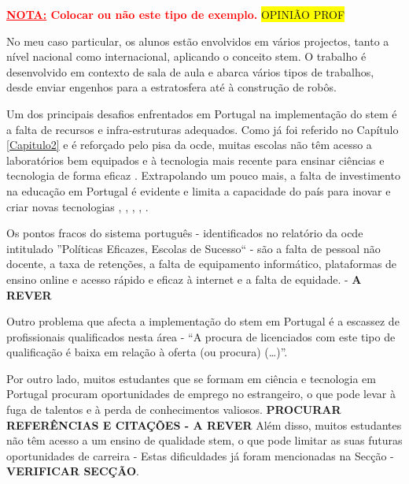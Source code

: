 \textcolor{red}{\textbf{\underline{NOTA:} Colocar ou não este tipo de exemplo.}}
\colorbox{yellow}{OPINIÃO PROF}

No meu caso particular, os alunos estão envolvidos em vários projectos, tanto a nível nacional como internacional, aplicando o conceito \acrshort{stem}. O trabalho é desenvolvido em contexto de sala de aula e abarca vários tipos de trabalhos, desde enviar engenhos para a estratosfera até à construção de robôs.



Um dos principais desafios enfrentados em Portugal na implementação do \acrshort{stem} é a falta de recursos e infra-estruturas adequados. Como já foi referido no Capítulo \ref{Capitulo2} e é reforçado pelo \acrfull{pisa} da \acrfull{ocde}, muitas escolas não têm acesso a laboratórios bem equipados e à tecnologia mais recente para ensinar ciências e tecnologia de forma eficaz \cite{pisa2018}. Extrapolando um pouco mais, a falta de investimento na educação em Portugal é evidente e limita a capacidade do país para inovar e criar novas tecnologias \cite{Oquefalt37:online}, \cite{Faltadei99:online}, \cite{Odesinve56:online}, \cite{EDUSTATP20:online}, \cite{Portugal69:online}.


Os pontos fracos do sistema português - identificados no relatório da \acrshort{ocde} intitulado ''Políticas Eficazes, Escolas de Sucesso`` - são a falta de pessoal não docente, a taxa de retenções, a falta de equipamento informático, plataformas de ensino online e acesso rápido e eficaz à internet e a falta de equidade. - \textbf{A REVER}

Outro problema que afecta a implementação do \acrshort{stem} em Portugal é a escassez de profissionais qualificados nesta área \cite{Qualific91:online} - ``A procura de licenciados com este tipo de qualificação é baixa em relação à oferta (ou procura) (\ldots)''.

Por outro lado, muitos estudantes que se formam em ciência e tecnologia em Portugal procuram oportunidades de emprego no estrangeiro, o que pode levar à fuga de talentos e à perda de conhecimentos valiosos. \textbf{PROCURAR REFERÊNCIAS E CITAÇÕES - A REVER} Além disso, muitos estudantes não têm acesso a um ensino de qualidade \acrshort{stem}, o que pode limitar as suas futuras oportunidades de carreira - Estas dificuldades já foram mencionadas na Secção - \textbf{VERIFICAR SECÇÃO}.


